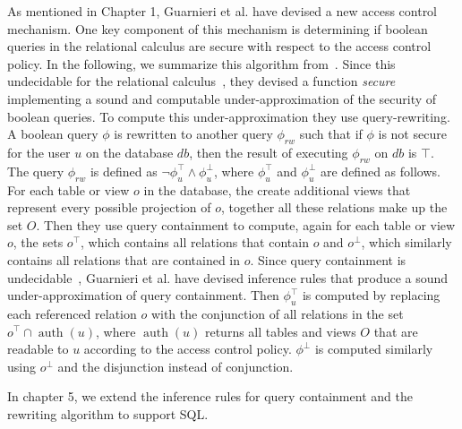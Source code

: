 As mentioned in Chapter 1, Guarnieri et al. have devised a new access control mechanism.
%
One key component of this mechanism is determining if boolean queries in the relational calculus are secure with respect to the access control policy.
%
In the following, we summarize this algorithm from~\cite{guarnieri2016strong}.
%
Since this undecidable for the relational calculus~\cite{guarnieri2014optimal}, they devised a function \emph{secure} implementing a sound and computable under-approximation of the security of boolean queries. 
%
To compute this under-approximation they use query-rewriting.
%
A boolean query $\phi$ is rewritten to another query $\phi_{rw}$ such that if $\phi$ is not secure for the user $u$ on the database $db$, then the result of executing $\phi_{rw}$ on $\mathit{db}$ is $\top$.
%
The query $\phi_{rw}$ is defined as $\lnot \phi^\top_u \land \phi^\bot_u$, where $\phi^\top_u$ and $\phi^\bot_u$ are defined as follows.
%
For each table or view $o$ in the database, the create additional views that represent every possible projection of $o$, together all these relations make up the set $O$.
%
Then they use query containment to compute, again for each table or view $o$, the sets $o^\top$, which contains all relations that contain $o$ and $o^\bot$, which similarly contains all relations that are contained in $o$.
%
Since query containment is undecidable~\cite{abiteboul1995foundations}, Guarnieri et al. have devised inference rules that produce a sound under-approximation of query containment.
%
Then $\phi^\top_u$ is computed by replacing each referenced relation $o$ with the conjunction of all relations in the set $o^\top \cap \operatorname{auth}(u)$, where $\operatorname{auth}(u)$ returns all tables and views $O$ that are readable to $u$ according to the access control policy.  
%
$\phi^\bot$ is computed similarly using $o^\bot$ and the disjunction instead of conjunction.

In chapter 5, we extend the inference rules for query containment and the rewriting algorithm to support SQL.
